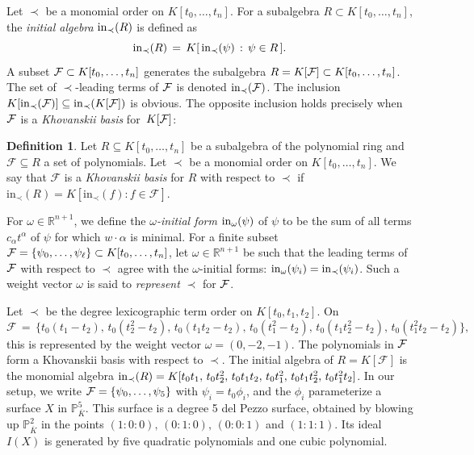 \documentclass[12pt]{article}
\theoremstyle{definition}
\newenvironment{example}
  {\pushQED{\qed}\renewcommand{\qedsymbol}{$\diamond$}\examplex}
  {\popQED\endexamplex}
\newtheorem{defn}[thm]{Definition}
\theoremstyle{remark}
\def\initial{{\mathrm{in}}}
\begin{document}
Let $\prec$ be a monomial order on $K[t_0, \ldots, t_n]$. For a subalgebra $R \subset K[t_0, \ldots, t_n]$, the \emph{initial algebra} ${\rm in}_\prec(R)$ is defined as 
\[ {\rm in}_\prec(R) \, = \, K[ \, {\rm in}_\prec(\psi) \, : \, \psi \in R \, ]. \]
A subset ${\cal F} \subset K[t_0, \ldots, t_n]$ generates the subalgebra $R = K[{\cal F}] \subset K[t_0, \ldots, t_n]$. The set of $\prec$-leading terms of ${\cal F}$ is denoted ${\rm in}_\prec({\cal F})$. The inclusion $K[{\rm in}_\prec({\cal F})] \subseteq {\rm in}_\prec(K[{\cal F}])$ is obvious. The opposite inclusion holds precisely when ${\cal F}$ is a \emph{Khovanskii basis} for~$K[{\cal F}]$: 
\begin{defn} \label{K.B. def}
Let $R\subseteq K[t_0,\dots,t_n]$ be a subalgebra of the polynomial ring and $\mathcal{F}\subseteq R$ a set of polynomials. Let $\prec$ be a monomial order on $K[t_0,\dots,t_n]$. 
We say that $\mathcal{F}$ is a \emph{Khovanskii basis} for $R$ with respect to $\prec$ if $\initial_{\prec}{(R)}=K[\initial_{\prec}{(f)} : f\in\mathcal{F}]$.
\end{defn}

For $\omega \in \mathbb{R}^{n+1}$, we define the \emph{$\omega$-initial form} ${\rm in}_\omega(\psi)$ of $\psi$ to be the sum of all terms $c_\alpha t^\alpha$ of $\psi$ for which $w \cdot \alpha$ is minimal. For a finite subset ${\cal F} = \{ \psi_0, \ldots, \psi_\ell \} \subset K[t_0, \ldots, t_n]$, let $\omega \in \mathbb{R}^{n+1}$ be such that the leading terms of ${\cal F}$ with respect to $\prec$ agree with the $\omega$-initial forms: ${\rm in}_\omega(\psi_i) = {\rm in}_{\prec}(\psi_i)$. Such a weight vector $\omega$ is said to \emph{represent} $\prec$ for ${\cal F}$. 




\begin{example} \label{KB example}
Let $\prec$ be the degree lexicographic term order on $K[t_0,t_1,t_2]$. On 
\[ \mathcal{F} \, = \, \{ t_0(t_1-t_2), \, t_0(t_2^2-t_2), \, t_0(t_1t_2-t_2), \, t_0(t_1^2-t_2), \, t_0(t_1t_2^2-t_2), \, t_0(t_1^2t_2-t_2) \}, \]
this is represented by the weight vector $\omega = (0,-2,-1)$.
The polynomials in ${\cal F}$ form a Khovanskii basis with respect to ${\prec}$. 
The initial algebra of $R = K[\mathcal{F}]$ is the monomial algebra ${\rm in}_\prec(R) = K[t_0t_1,\, t_0t_2^2,\, t_0t_1t_2,\, t_0t_1^2,\, t_0t_1t_2^2,\, t_0t_1^2t_2]$. In our setup, we write ${\cal F} = \{\psi_0, \ldots, \psi_5\}$ with $\psi_i = t_0 \phi_i$, and the $\phi_i$ parameterize a surface $X$ in $\mathbb{P}^5_{\overline{K}}$. This surface is a degree 5 del Pezzo surface, obtained by blowing up $\mathbb{P}^2_{\overline{K}}$ in the points $(1:0:0),\, (0:1:0),\, (0:0:1)$ and $(1:1:1)$.
Its ideal $I(X)$ is generated by five quadratic polynomials and one cubic polynomial.
\end{example}
\end{document}
